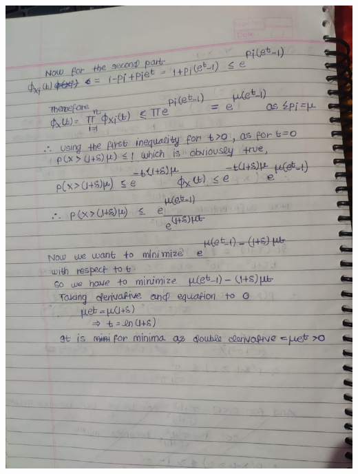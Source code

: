 \documentclass{article}
\theoremstyle{remark}
\begin{document}
\includegraphics[width=\textwidth, height=\textheight, keepaspectratio]{4c.jpeg} \par
\newpage
\end{document}
